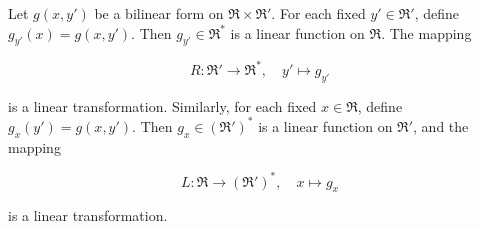 Let $g(x, y')$ be a bilinear form on $\mathfrak{R} \times \mathfrak{R}'$. For each fixed $y' \in \mathfrak{R}'$, define $g_{y'}(x) = g(x, y')$. Then $g_{y'} \in \mathfrak{R}^*$ is a linear function on $\mathfrak{R}$. The mapping

$$R: \mathfrak{R}' \to \mathfrak{R}^*, \quad y' \mapsto g_{y'}$$

is a linear transformation. Similarly, for each fixed $x \in \mathfrak{R}$, define $g_x(y') = g(x, y')$. Then $g_x \in (\mathfrak{R}')^*$ is a linear function on $\mathfrak{R}'$, and the mapping

$$L: \mathfrak{R} \to (\mathfrak{R}')^*, \quad x \mapsto g_x$$

is a linear transformation.

